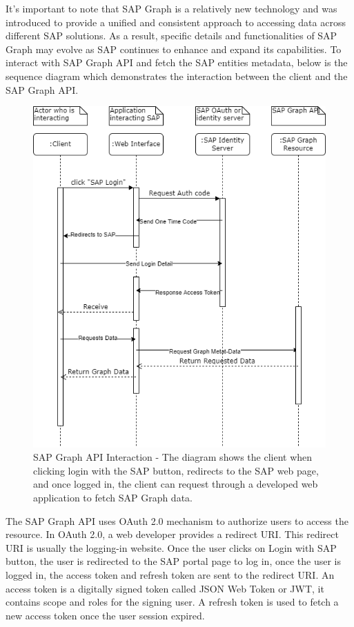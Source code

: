 \documentclass{article}
\begin{document}
It's important to note that SAP Graph is a relatively new technology and was introduced to provide a unified and consistent approach to accessing data across different SAP solutions. As a result, specific details and functionalities of SAP Graph may evolve as SAP continues to enhance and expand its capabilities. To interact with SAP Graph API and fetch the SAP entities metadata, below is the sequence diagram which demonstrates the interaction between the client and the SAP Graph API.

\begin{figure}[ht!]
    \centering
    \includegraphics[scale=0.5]{sap-graph-api-interaction}
    \caption{SAP Graph API Interaction - The diagram shows the client when clicking login with the SAP button, redirects to the SAP web page, and once logged in, the client can request through a developed web application to fetch SAP Graph data.}
    \label{fig:graph-api}
\end{figure}

The SAP Graph API uses OAuth 2.0 mechanism to authorize users to access the resource. In OAuth 2.0, a web developer provides a redirect URI. This redirect URI is usually the logging-in website. Once the user clicks on Login with SAP button, the user is redirected to the SAP portal page to log in, once the user is logged in, the access token and refresh token are sent to the redirect URI. An access token is a digitally signed token called JSON Web Token or JWT, it contains scope and roles for the signing user. A refresh token is used to fetch a new access token once the user session expired.
\end{document}
